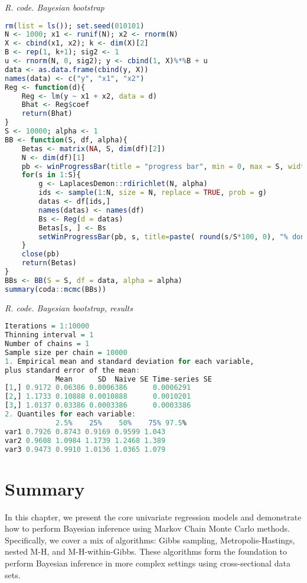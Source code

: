 \begin{tcolorbox}[enhanced,width=4.67in,center upper,
	fontupper=\large\bfseries,drop shadow southwest,sharp corners]
	\textit{R. code. Bayesian bootstrap}
	\begin{VF}
		\begin{lstlisting}[language=R]
rm(list = ls()); set.seed(010101)
N <- 1000; x1 <- runif(N); x2 <- rnorm(N)
X <- cbind(x1, x2); k <- dim(X)[2]
B <- rep(1, k+1); sig2 <- 1
u <- rnorm(N, 0, sig2); y <- cbind(1, X)%*%B + u
data <- as.data.frame(cbind(y, X))
names(data) <- c("y", "x1", "x2")
Reg <- function(d){
	Reg <- lm(y ~ x1 + x2, data = d)
	Bhat <- Reg$coef
	return(Bhat)
}
S <- 10000; alpha <- 1
BB <- function(S, df, alpha){
	Betas <- matrix(NA, S, dim(df)[2])
	N <- dim(df)[1]
	pb <- winProgressBar(title = "progress bar", min = 0, max = S, width = 300)
	for(s in 1:S){
		g <- LaplacesDemon::rdirichlet(N, alpha)
		ids <- sample(1:N, size = N, replace = TRUE, prob = g)
		datas <- df[ids,]
		names(datas) <- names(df)
		Bs <- Reg(d = datas)
		Betas[s, ] <- Bs
		setWinProgressBar(pb, s, title=paste( round(s/S*100, 0), "% done"))
	}
	close(pb)
	return(Betas)
}
BBs <- BB(S = S, df = data, alpha = alpha)
summary(coda::mcmc(BBs))
\end{lstlisting}
	\end{VF}
\end{tcolorbox} 
 
\begin{tcolorbox}[enhanced,width=4.67in,center upper,
	fontupper=\large\bfseries,drop shadow southwest,sharp corners]
	\textit{R. code. Bayesian bootstrap, results}
	\begin{VF}
		\begin{lstlisting}[language=R]
Iterations = 1:10000
Thinning interval = 1 
Number of chains = 1 
Sample size per chain = 10000 
1. Empirical mean and standard deviation for each variable,
plus standard error of the mean:
			Mean      SD  Naive SE Time-series SE
[1,] 0.9172 0.06386 0.0006386      0.0006291
[2,] 1.1733 0.10888 0.0010888      0.0010201
[3,] 1.0137 0.03386 0.0003386      0.0003386
2. Quantiles for each variable:
			2.5%    25%    50%    75% 97.5%
var1 0.7926 0.8743 0.9169 0.9599 1.043
var2 0.9608 1.0984 1.1739 1.2468 1.389
var3 0.9473 0.9910 1.0136 1.0365 1.079
\end{lstlisting}
	\end{VF}
\end{tcolorbox} 


\section{Summary}\label{sec611}
In this chapter, we present the core univariate regression models and demonstrate how to perform Bayesian inference using Markov Chain Monte Carlo methods. Specifically, we cover a mix of algorithms: Gibbs sampling, Metropolis-Hastings, nested M-H, and M-H-within-Gibbs. These algorithms form the foundation to perform Bayesian inference in more complex settings using cross-sectional data sets.

